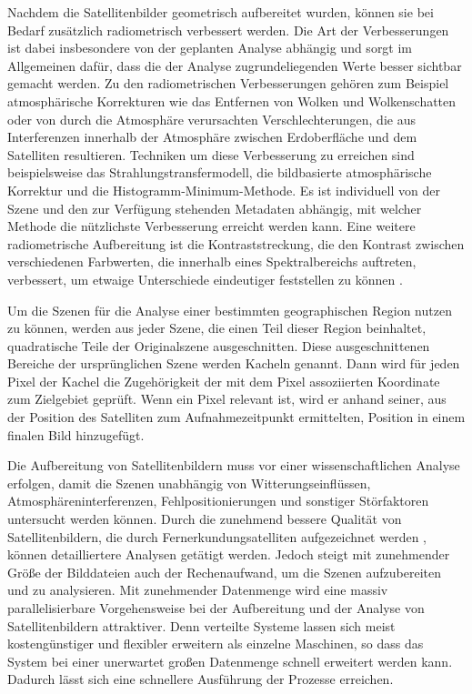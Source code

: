 Nachdem die Satellitenbilder geometrisch aufbereitet wurden, können sie bei Bedarf zusätzlich radiometrisch verbessert werden. Die Art der Verbesserungen ist dabei insbesondere von der geplanten Analyse abhängig und sorgt im Allgemeinen dafür, dass die der Analyse zugrundeliegenden Werte besser sichtbar gemacht werden. Zu den radiometrischen Verbesserungen gehören zum Beispiel atmosphärische Korrekturen wie das Entfernen von Wolken und Wolkenschatten oder von durch die Atmosphäre verursachten Verschlechterungen, die aus Interferenzen innerhalb der Atmosphäre zwischen Erdoberfläche und dem Satelliten resultieren. Techniken um diese Verbesserung zu erreichen sind beispielsweise das Strahlungstransfermodell, die bildbasierte atmosphärische Korrektur und die Histogramm-Minimum-Methode. Es ist individuell von der Szene und den zur Verfügung stehenden Metadaten abhängig, mit welcher Methode die nützlichste Verbesserung erreicht werden kann. 
Eine weitere radiometrische Aufbereitung ist die Kontraststreckung, die den Kontrast zwischen verschiedenen Farbwerten, die innerhalb eines Spektralbereichs auftreten, verbessert, um etwaige Unterschiede eindeutiger feststellen zu können \cite{Padge1997}.

Um die Szenen für die Analyse einer bestimmten geographischen Region nutzen zu können, werden aus jeder Szene, die einen Teil dieser Region beinhaltet, quadratische Teile der Originalszene ausgeschnitten. Diese ausgeschnittenen Bereiche der ursprünglichen Szene werden Kacheln genannt. Dann wird für jeden Pixel der Kachel die Zugehörigkeit der mit dem Pixel assoziierten Koordinate zum Zielgebiet geprüft. Wenn ein Pixel relevant ist, wird er anhand seiner, aus der Position des Satelliten zum Aufnahmezeitpunkt ermittelten, Position in einem finalen Bild hinzugefügt. 

Die Aufbereitung von Satellitenbildern muss vor einer wissenschaftlichen Analyse erfolgen, damit die Szenen unabhängig von Witterungseinflüssen, Atmosphäreninterferenzen, Fehlpositionierungen und sonstiger Störfaktoren untersucht werden können. Durch die zunehmend bessere Qualität von Satellitenbildern, die durch Fernerkundungsatelliten aufgezeichnet werden \cite{Markham2004}, können detailliertere Analysen getätigt werden. Jedoch steigt mit zunehmender Größe der Bilddateien auch der Rechenaufwand, um die Szenen aufzubereiten und zu analysieren. Mit zunehmender Datenmenge wird eine massiv parallelisierbare Vorgehensweise bei der Aufbereitung und der Analyse von Satellitenbildern attraktiver. Denn verteilte Systeme lassen sich meist kostengünstiger und flexibler erweitern als einzelne Maschinen, so dass das System bei einer unerwartet großen Datenmenge schnell erweitert werden kann. Dadurch lässt sich eine schnellere Ausführung der Prozesse erreichen.

